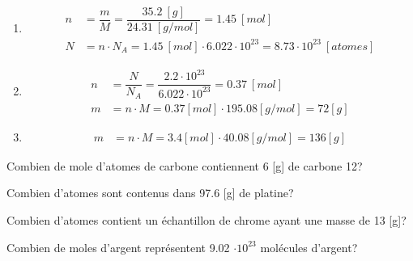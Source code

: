 \documentclass[
  11pt,
  a4paper,
  openany]{book}
\begin{document}
\begin{Answer}

\begin{enumerate}
\def\labelenumi{\arabic{enumi}.}
\item
  \[ \begin{split}
       n &= \dfrac{m}{M} = \dfrac{35.2~[g]}{24.31~[g/mol]} = 1.45~[mol] \\
       N &= n \cdot N_{A} = 1.45~[mol] \cdot 6.022\cdot10^{23} = 8.73\cdot10^{23}~[atomes]
       \end{split} \]
\item
  \[ \begin{split}
       n &= \dfrac{N}{N_{A}} = \dfrac{2.2\cdot10^{23}}{6.022\cdot10^{23}} = 0.37~[mol] \\
       m &= n \cdot M = 0.37[mol] \cdot 195.08[g/mol] = 72[g]
       \end{split} \]
\item
  \[ \begin{split}
       m &= n \cdot M = 3.4[mol] \cdot 40.08[g/mol] = 136[g]
       \end{split} \]
\end{enumerate}

\end{Answer}

\begin{Exercise}

Combien de mole d'atomes de carbone contiennent 6 {[}g{]} de carbone 12?


Combien d'atomes sont contenus dans 97.6 {[}g{]} de platine?


Combien d'atomes contient un échantillon de chrome ayant une masse de 13 {[}g{]}?


Combien de moles d'argent représentent 9.02 \(\cdot 10^{23}\) molécules d'argent?


\end{Exercise}
\end{document}
